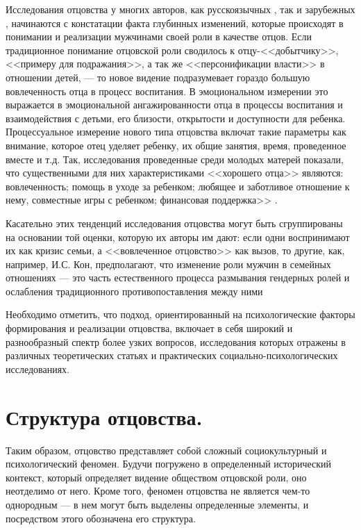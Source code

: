 \documentclass{../../common/thesisbyxetex}
\begin{document}
Исследования отцовства у многих авторов, как русскоязычных \cite{relot, psyot}, так и зарубежных
\cite{meta, morfat, legfat}, начинаются с констатации факта глубинных изменений, которые происходят
в понимании и реализации мужчинами своей роли в качестве отцов. Если традиционное понимание
отцовской роли сводилось к отцу-<<добытчику>>, <<примеру для подражания>>, а так же
<<персонификации власти>> в отношении детей, --- то новое видение подразумевает гораздо большую
вовлеченность отца в процесс воспитания. В эмоциональном измерении это выражается в  эмоциональной
ангажированности отца в процессы воспитания и взаимодействия с детьми, его близости, открытости и
доступности для ребенка. Процессуальное измерение нового типа отцовства включат такие параметры как
внимание, которое отец уделяет ребенку, их общие занятия, время, проведенное вместе и т.д.
Так, исследования проведенные среди молодых матерей показали, что существенными  для них
характеристиками <<хорошего отца>> являются: вовлеченность; помощь в уходе за ребенком; любящее и
заботливое отношение к нему, совместные игры с ребенком; финансовая поддержка>> \cite[137]{money}.

Касательно этих тенденций исследования отцовства могут быть сгруппированы на основании той оценки,
которую их авторы им дают: если одни воспринимают их как кризис семьи, а <<вовлеченное отцовство>>
как вызов, то другие, как, например, И.С. Кон, предполагают, что изменение роли мужчин в семейных
отношениях --- это часть естественного процесса размывания гендерных ролей и ослабления
традиционного противопоставления между ними \cite{konmen}

Необходимо отметить, что подход, ориентированный на психологические факторы формирования и
реализации отцовства, включает в себя широкий и разнообразный спектр более узких вопросов,
исследования которых отражены в различных теоретических статьях и практических
социально-психологических исследованиях.



\section{Структура отцовства.}

Таким образом, отцовство представляет собой сложный  социокультурный и психологический феномен.
Будучи погружено в определенный исторический контекст, который определяет видение обществом
отцовской роли, оно неотделимо от него. Кроме того, феномен отцовства не является чем-то однородным
--- в нем могут быть выделены определенные элементы, и посредством этого обозначена его структура.
\end{document}
